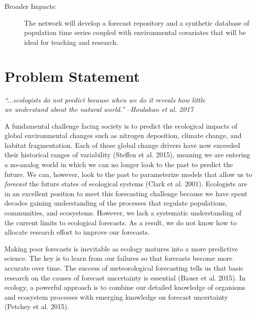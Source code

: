 \documentclass[12pt,]{article}
\begin{document}
\begin{description}
\item[Broader Impacts:] The network will develop a forecast repository and a synthetic database of population time series coupled with environmental covariates that will be ideal for teaching and research.
\end{description}

\newpage{}


\section{Problem Statement}\vspace{-1em}

\small{}
\phantom{}\hspace{8em}\textit{``...ecologists do not predict because when we do it reveals how little\\\phantom{}\hspace{8em}we understand about the natural world.''}
--\textit{Houlahan et al. 2017}

\normalsize{} \vspace{0.5em} A fundamental challenge facing society is
to predict the ecological impacts of global environmental changes such
as nitrogen deposition, climate change, and habitat fragmentation. Each
of these global change drivers have now exceeded their historical ranges
of variability (Steffen et al. 2015), meaning we are entering a
no-analog world in which we can no longer look to the past to predict
the future. We can, however, look to the past to parameterize models
that allow us to \emph{forecast} the future states of ecological systems
(Clark et al. 2001). Ecologists are in an excellent position to meet
this forecasting challenge because we have spent decades gaining
understanding of the processes that regulate populations, communities,
and ecosystems. However, we lack a systematic understanding of the
current limits to ecological forecasts. As a result, we do not know how
to allocate research effort to improve our forecasts.

Making poor forecasts is inevitable as ecology matures into a more
predictive science. The key is to learn from our failures so that
forecasts become more accurate over time. The success of meteorological
forecasting tells us that basic research on the causes of forecast
uncertainty is essential (Bauer et al. 2015). In ecology, a powerful
approach is to combine our detailed knowledge of organisms and ecosystem
processes with emerging knowledge on forecast uncertainty (Petchey et
al. 2015).
\end{document}
